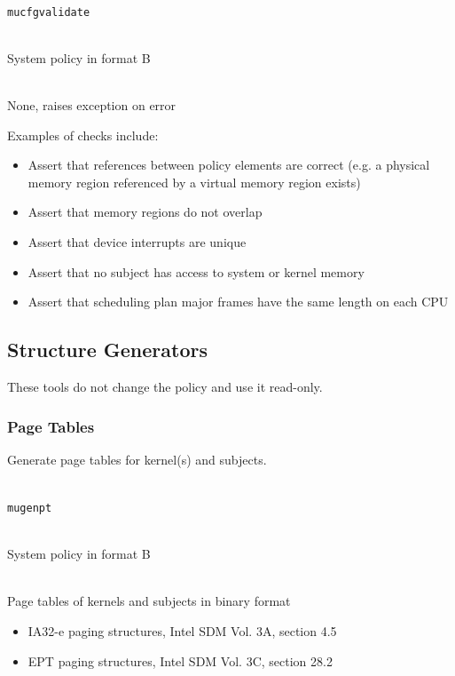 \documentclass[a4paper,twoside,titlepage]{article}
\begin{document}
\begin{description} \itemsep1pt \parskip0pt
	\item[Name] \hfill \\
		\texttt{mucfgvalidate}
	\item[Input] \hfill \\
		System policy in format B
	\item[Output] \hfill \\
		None, raises exception on error
\end{description}

Examples of checks include:

\begin{itemize}
	\item Assert that references between policy elements are correct (e.g. a
		physical memory	region referenced by a virtual memory region exists)
	\item Assert that memory regions do not overlap
	\item Assert that device interrupts are unique
	\item Assert that no subject has access to system or kernel memory
	\item Assert that scheduling plan major frames have the same length on each
		CPU
\end{itemize}

\subsection{Structure Generators}
\label{sec:tools-gen}
These tools do not change the policy and use it read-only.

\subsubsection{Page Tables}
Generate page tables for kernel(s) and subjects.

\begin{description} \itemsep1pt \parskip0pt
	\item[Name] \hfill \\
		\texttt{mugenpt}
	\item[Input] \hfill \\
		System policy in format B
	\item[Output] \hfill \\
		Page tables of kernels and subjects in binary format
	\item[Output format] \hfill
		\begin{itemize}
			\item IA32-e paging structures, Intel SDM Vol. 3A, section 4.5
			\item EPT paging structures, Intel SDM Vol. 3C, section 28.2
		\end{itemize}
\end{description}
\end{document}
